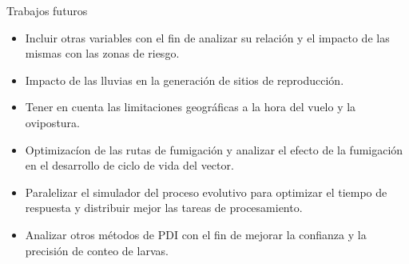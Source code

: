 \begin{frame}[t]{Trabajos futuros}
    \begin{center}
        \begin{itemize}
            \item Incluir otras variables con el fin de analizar su relación y el impacto de las mismas con las zonas de riesgo.

            \item Impacto de las lluvias en la generación de sitios de reproducción.

            \item Tener en cuenta las limitaciones geográficas a la hora del vuelo y la ovipostura.

            \item Optimizacíon de las rutas de fumigación y analizar el efecto de la fumigación en el desarrollo de ciclo de vida del vector.

            \item Paralelizar el simulador del proceso evolutivo para optimizar el tiempo de respuesta y distribuir mejor las tareas de procesamiento.

            \item Analizar otros métodos de PDI con el fin de mejorar la confianza y la precisión de conteo de larvas.
        \end{itemize}
    \end{center}
\end{frame}
